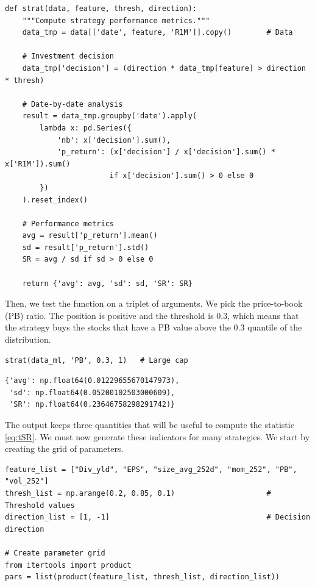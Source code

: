 \begin{verbatim}
def strat(data, feature, thresh, direction):
    """Compute strategy performance metrics."""
    data_tmp = data[['date', feature, 'R1M']].copy()        # Data
    
    # Investment decision
    data_tmp['decision'] = (direction * data_tmp[feature] > direction * thresh)
    
    # Date-by-date analysis
    result = data_tmp.groupby('date').apply(
        lambda x: pd.Series({
            'nb': x['decision'].sum(),
            'p_return': (x['decision'] / x['decision'].sum() * x['R1M']).sum()
                        if x['decision'].sum() > 0 else 0
        })
    ).reset_index()
    
    # Performance metrics
    avg = result['p_return'].mean()
    sd = result['p_return'].std()
    SR = avg / sd if sd > 0 else 0
    
    return {'avg': avg, 'sd': sd, 'SR': SR}
\end{verbatim}

Then, we test the function on a triplet of arguments. We pick the price-to-book (PB) ratio. The position is positive and the threshold is 0.3, which means that the strategy buys the stocks that have a PB value above the 0.3 quantile of the distribution.

\begin{verbatim}
strat(data_ml, 'PB', 0.3, 1)   # Large cap
\end{verbatim}

\begin{verbatim}
{'avg': np.float64(0.01229655670147973),
 'sd': np.float64(0.05200102503000609),
 'SR': np.float64(0.23646758298291742)}
\end{verbatim}

The output keeps three quantities that will be useful to compute the statistic \ref{eq:tSR}. We must now generate these indicators for many strategies. We start by creating the grid of parameters.

\begin{verbatim}
feature_list = ["Div_yld", "EPS", "size_avg_252d", "mom_252", "PB", "vol_252"]
thresh_list = np.arange(0.2, 0.85, 0.1)                     # Threshold values
direction_list = [1, -1]                                    # Decision direction

# Create parameter grid
from itertools import product
pars = list(product(feature_list, thresh_list, direction_list))
\end{verbatim}

